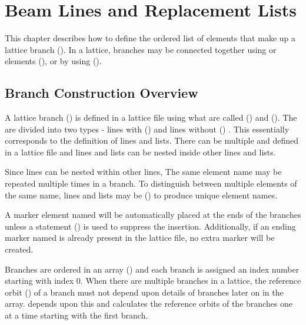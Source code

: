 \chapter{Beam Lines and Replacement Lists}
\label{c:sequence}

This chapter describes how to define the ordered list of elements that make up a lattice branch
().  In a lattice, branches may be connected together using  or
 elements (), or by using  ().

\section{Branch Construction Overview}
\label{s:branch.construct}

A lattice branch () is defined in a lattice file using what are called 
() and  ().  The  are
divided into two types - lines with () and lines without
() . This essentially corresponds to the \mad
definition of lines and lists. There can be multiple  and 
defined in a lattice file and lines and lists can be nested inside other lines and lists.

Since lines can be nested within other lines, The same element name may be repeated multiple times
in a branch. To distinguish between multiple elements of the same name, lines and lists may be
 () to produce unique element names.

A marker element named  will be automatically placed at the ends of the branches unless a
 statement () is used to suppress the insertion.
Additionally, if an ending marker named  is already present in the lattice file, no extra
marker will be created.

Branches are ordered in an array () and each branch is assigned an index number
starting with index 0. When there are multiple branches in a lattice, the reference orbit
() of a branch must not depend upon details of branches later on in the array.  \bmad
depends upon this and calculates the reference orbits of the branches one at a time starting with
the first branch.

